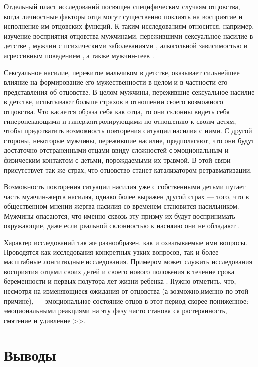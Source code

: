 \documentclass{../../common/thesisbyxetex}
\begin{document}
Отдельный пласт исследований посвящен специфическим случаям отцовства, когда личностные факторы
отца могут существенно повлиять на восприятие и исполнение им отцовских функций. К таким
исследованиям относится, например, изучение восприятия отцовства мужчинами, пережившими сексуальное
насилие в детстве \cite{sex}, мужчин с психическими заболеваниями \cite{gbi}, алкогольной
зависимостью и агрессивным поведением \cite{alc}, а также мужчин-геев \cite{gay}.

Сексуальное насилие, пережитое мальчиком в детстве, оказывает сильнейшее влияние на формирование
его мужественности в целом и в частности его представления об отцовстве. В целом мужчины,
пережившие сексуальное насилие в детстве, испытывают больше страхов в отношении своего возможного
отцовства.  Что касается образа себя как отца, то они склонны видеть себя гиперопекающими  и
гиперконтролирующими по отношению к своим детям, чтобы предотватить возможность повторения
ситуации насилия с ними. С другой стороны, некоторые мужчины, пережившие насилие, предполагают,
что они будут достаточно отстраненными отцами ввиду сложностей с эмоциональным и физическим
контактом с детьми, порождаемыми их травмой. В этой связи присутствует так же страх, что отцовство
станет катализатором ретравматизации.

Возможность повторения ситуации насилия уже с собственными детьми пугает часть мужчин-жертв
насилия, однако более выражен другой страх --- того, что в общественном мнении жертва насилия
со временем становится насильником. Мужчины опасаются, что именно сквозь эту призму их будут
воспринимать окружающие, даже если реальной склонностью к насилию они не обладают \cite{sex}.

Характер исследований так же разнообразен, как и охватываемые ими вопросы. Проводятся как
исследования конкретных узких вопросов, так и более масштабные лонгитюдные исследования. Примером
может служить исследования восприятия отцами своих детей и своего нового положения в течение срока
беременности и первых полутора лет жизни ребенка \cite{percep}. Нужно отметить, что, несмотря на
изменяющиеся ожидания от отцовства (а возможно,именно по этой причине), --- эмоциональное состояние
отцов в этот период скорее пониженное: эмоциональными реакциями на эту фазу часто
становятся растерянность, смятение и удивление \cite[12]{meta}>>.

\chapter{Выводы}
\end{document}
